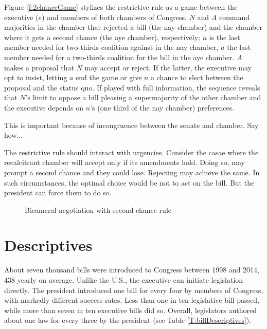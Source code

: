 \documentclass[letter,12pt]{article}
\begin{document}
Figure \ref{f:2chanceGame} stylizes the restrictive rule as a game between the executive ($e$) and members of both chambers of Congress. $N$ and $A$ command majorities in the chamber that rejected a bill (the nay chamber) and the chamber where it gets a second chance (the aye chamber), respectively; $n$ is the last member needed for two-thirds coalition against in the nay chamber, $a$ the last member needed for a two-thirds coalition for the bill in the aye chamber. $A$ makes a proposal that $N$ may accept or reject. If the latter, the executive may opt to insist, letting $a$ end the game or give $n$ a chance to slect between the proposal and the status quo. If played with full information, the sequence reveals that $N$'s limit to oppose a bill pleasing a supermajority of the other chamber and the executive depends on $n$'s (one third of the nay chamber) preferences. 

This is important because of incongruence between the senate and chamber. Say how...

The restrictive rule should interact with urgencies. Consider the casae where the recalcitrant chamber will accept only if its amendments hold. Doing so, may prompt a second chance and they could lose. Rejecting may achieve the same. In such circumstances, the optimal choice would be not to act on the bill. But the president can force them to do so. 

\begin{figure}
  \begin{center}
  \caption{Bicameral negotiation with second chance rule}\label{f:2chanceEql}
  \end{center}
\end{figure}

\section{Descriptives}

About seven thousand bills were introduced to Congress between 1998 and 2014, 438 yearly on average. Unlike the U.S., the executive can initiate legislation directly. The president introduced one bill for every four by members of Congress, with markedly different success rates. Less than one in ten legislative bill passed, while more than seven in ten executive bills did so. Overall, legislators authored about one law for every three by the president (see Table \ref{T:billDescriptives}).
\end{document}
